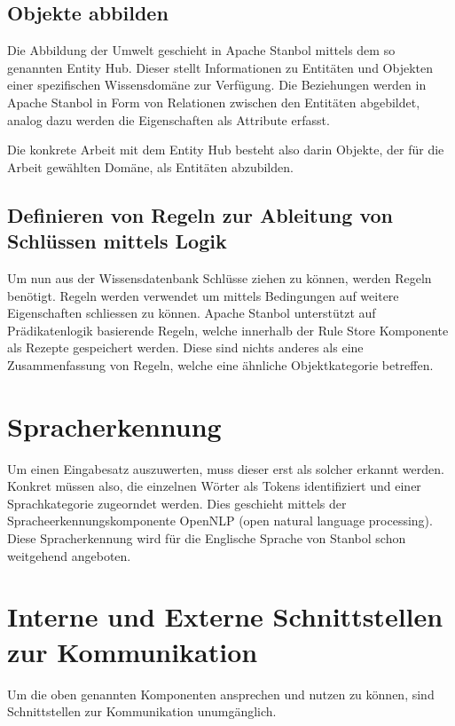\subsection{Objekte abbilden}
\label{subsec:architektur_wissensdatenbank_Objekte}
Die Abbildung der Umwelt geschieht in Apache Stanbol mittels dem so genannten Entity Hub.
Dieser stellt Informationen zu Entitäten und Objekten einer spezifischen Wissensdomäne zur Verfügung. Die Beziehungen werden in Apache Stanbol in Form von Relationen zwischen den Entitäten abgebildet, analog dazu werden die Eigenschaften als Attribute erfasst.

Die konkrete Arbeit mit dem Entity Hub besteht also darin Objekte, der für die Arbeit gewählten Domäne, als Entitäten abzubilden.

\subsection{Definieren von Regeln zur Ableitung von Schlüssen mittels Logik}
\label{sec:architektur_regeln}
Um nun aus der Wissensdatenbank Schlüsse ziehen zu können, werden Regeln benötigt. Regeln werden verwendet um mittels Bedingungen auf weitere Eigenschaften schliessen zu können.
Apache Stanbol unterstützt auf Prädikatenlogik basierende Regeln, welche innerhalb der Rule Store Komponente als Rezepte gespeichert werden. Diese sind nichts anderes als eine Zusammenfassung von Regeln, welche eine ähnliche Objektkategorie betreffen.

\section{Spracherkennung}
\label{sec:architektur_spracherkennung}
Um einen Eingabesatz auszuwerten, muss dieser erst als solcher erkannt werden. Konkret müssen also, die einzelnen Wörter als Tokens identifiziert und einer Sprachkategorie zugeorndet werden. Dies geschieht mittels der Spracheerkennungskomponente OpenNLP (open natural language processing). Diese Spracherkennung wird für die Englische Sprache von Stanbol schon weitgehend angeboten.


\section{Interne und Externe Schnittstellen zur Kommunikation}
\label{sec:architektur_schnittstellen}
Um die oben genannten Komponenten ansprechen und nutzen zu können, sind Schnittstellen zur Kommunikation unumgänglich.

